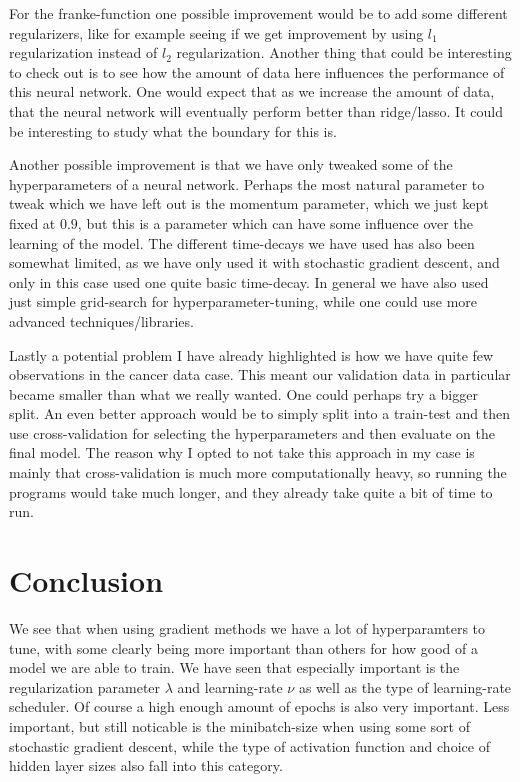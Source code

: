 \documentclass{article}
\begin{document}
For the franke-function one possible improvement would be to add some different
regularizers, like for example seeing if we get improvement by using $l_1$
regularization instead of $l_2$ regularization. Another thing that could be
interesting to check out is to see how the amount of data here influences the
performance of this neural network.  One would expect that as we increase the
amount of data, that the neural network will eventually perform better than
ridge/lasso. It could be interesting to study what the boundary for this is.

Another possible improvement is that we have only tweaked some of the
hyperparameters of a neural network. Perhaps the most natural parameter to tweak
which we have left out is the momentum parameter, which we just kept fixed at
$0.9$, but this is a parameter which can have some influence over the learning
of the model. The different time-decays we have used has also been somewhat
limited, as we have only used it with stochastic gradient descent, and only in
this case used one quite basic time-decay. In general we have also used just
simple grid-search for hyperparameter-tuning, while one could use more advanced
techniques/libraries.

Lastly a potential problem I have already highlighted is how we have quite few
observations in the cancer data case. This meant our validation data in
particular became smaller than what we really wanted. One could perhaps try a
bigger split. An even better approach would be to simply split into a train-test
and then use cross-validation for selecting the hyperparameters and then
evaluate on the final model. The reason why I opted to not take this approach in
my case is mainly that cross-validation is much more computationally heavy, so
running the programs would take much longer, and they already take quite a bit
of time to run.

\section{Conclusion}
We see that when using gradient methods we have a lot of hyperparamters to tune,
with some clearly being more important than others for how good of a model we
are able to train. We have seen that especially important is the regularization
parameter $\lambda$ and learning-rate $\nu$ as well as the type of learning-rate
scheduler. Of course a high enough amount of epochs is also very important. Less
important, but still noticable is the minibatch-size when using some sort of
stochastic gradient descent, while the type of activation function and choice of
hidden layer sizes also fall into this category.
\end{document}
